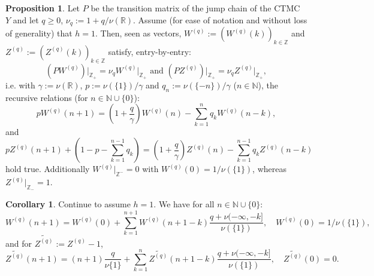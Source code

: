 \documentclass[pdftex,oneside,11pt,reqno]{amsart}
\theoremstyle{definition}
\theoremstyle{theorem}
\newtheorem{proposition}{Proposition}[section]
\newtheorem{corollary}{Corollary}[section]
\theoremstyle{remark}
\numberwithin{equation}{section}
\numberwithin{definition}{section}
\begin{document}
\begin{proposition}\label{proposition:calculating_scale_functions:basic}
Let $P$ be the transition matrix of the jump chain of the CTMC $Y$ and let $q\geq 0$, $\nu_q:=1+q/{\nu}(\mathbb{R})$. Assume (for ease of notation and without loss of generality) that $h=1$. Then, seen as vectors, ${W^{(q)}}:=({W^{(q)}}(k))_{k\in{\mathbb Z}}$ and ${Z^{(q)}}:=({Z^{(q)}}(k))_{k\in{\mathbb Z}}$ satisfy, entry-by-entry: $$(P{W^{(q)}})\vert_{{\mathbb Z}_+}=\nu_q{W^{(q)}}\vert_{{\mathbb Z}_+}\text{ and }(P{Z^{(q)}})\vert_{{\mathbb Z}_+}=\nu_q{Z^{(q)}}\vert_{{\mathbb Z}_+},$$ i.e.  with $\gamma:={\nu}({\mathbb R})$, $p:={\nu}(\{1\})/\gamma$ and $q_n:={\nu}(\{-n\})/\gamma$ ($n\in\mathbb{N}$), the recursive relations (for $n\in \mathbb{N}\cup \{0\}$): 
\begin{equation}\label{equation:recursion:Wq_basic}
p{W^{(q)}}(n+1)=\left(1+\frac{q}{\gamma}\right){W^{(q)}}(n)-\sum_{k=1}^nq_k{W^{(q)}}(n-k),
\end{equation}
 and 
\begin{equation}\label{equation:recursion:Zq:basic}
p{Z^{(q)}}(n+1)+\left(1-p-\!\!\sum_{k=1}^{n-1}q_k\right)=\left(1+\frac{q}{\gamma}\right){Z^{(q)}}(n)-\!\!\sum_{k=1}^{n-1}q_k{Z^{(q)}}(n-k)
\end{equation}
hold true.  Additionally ${W^{(q)}}\vert_{\mathbb{Z}^-}=0$ with ${W^{(q)}}(0)=1/{\nu}(\{1\})$, whereas ${Z^{(q)}}\vert_{\mathbb{Z}_-}=1$.
\end{proposition}

\begin{corollary}\label{proposition:calculating_scale_functions}
Continue to assume $h=1$. We have for all $n\in \mathbb{N}\cup \{0\}$:
\begin{equation}\label{equation:recursion:Wq}
{W^{(q)}}(n+1)={W^{(q)}}(0)+\sum_{k=1} ^{n+1}{W^{(q)}}(n+1-k)\frac{q+{\nu}(-\infty,-k]}{{\nu}(\{1\})},\quad {W^{(q)}}(0)=1/{\nu}(\{1\}),
\end{equation}
and for $\widetilde{Z^{(q)}}:={Z^{(q)}}-1$,
\begin{equation}\label{equation:recursion:Zq}
\widetilde{Z^{(q)}}(n+1)=(n+1)\frac{q}{{\nu}\{1\}}+\sum_{k=1}^n\widetilde{Z^{(q)}}(n+1-k)\frac{q+{\nu}(-\infty,-k]}{{\nu}(\{1\})},\quad \widetilde{Z^{(q)}}(0)=0.
\end{equation}
\end{corollary}
\end{document}
